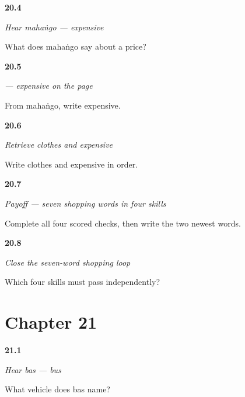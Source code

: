 \noindent\begin{minipage}[t]{\linewidth}
\raggedright
\hypertarget{review-MW-C15-hear-mahango-meaning}{\textbf{20.4}} \emph{Hear \emph{mahaṅgo} — expensive}\par
\small What does mahaṅgo say about a price?
\end{minipage}\par\medskip

\noindent\begin{minipage}[t]{\linewidth}
\raggedright
\hypertarget{review-MW-C15-mahango-dictation}{\textbf{20.5}} \emph{ — expensive on the page}\par
\small From mahaṅgo, write expensive.
\end{minipage}\par\medskip

\noindent\begin{minipage}[t]{\linewidth}
\raggedright
\hypertarget{review-MW-R15-shopping-new-two-recall}{\textbf{20.6}} \emph{Retrieve clothes and expensive}\par
\small Write clothes and expensive in order.
\end{minipage}\par\medskip

\noindent\begin{minipage}[t]{\linewidth}
\raggedright
\hypertarget{review-MW-C15-shopping-seven-payoff}{\textbf{20.7}} \emph{Payoff — seven shopping words in four skills}\par
\small Complete all four scored checks, then write the two newest words.
\end{minipage}\par\medskip

\noindent\begin{minipage}[t]{\linewidth}
\raggedright
\hypertarget{review-MW-R15-shopping-close-recall}{\textbf{20.8}} \emph{Close the seven-word shopping loop}\par
\small Which four skills must pass independently?
\end{minipage}\par\medskip

\section*{Chapter 21}

\noindent\begin{minipage}[t]{\linewidth}
\raggedright
\hypertarget{review-MW-C16-hear-bas-meaning}{\textbf{21.1}} \emph{Hear \emph{bas} — bus}\par
\small What vehicle does bas name?
\end{minipage}\par\medskip

